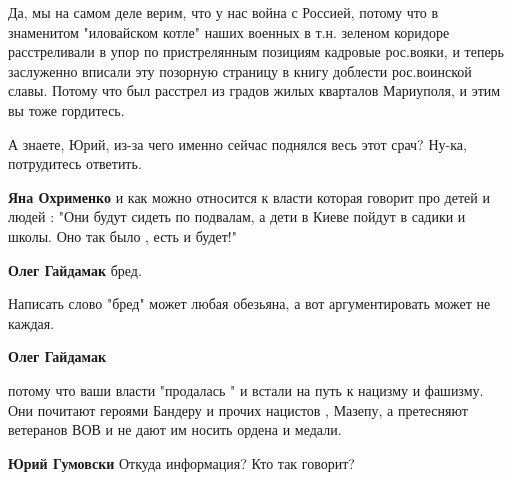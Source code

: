 \begin{itemize}
\begin{itemize}


Да, мы на самом деле верим, что у нас война с Россией, потому что в знаменитом
"иловайском котле" наших военных в т.н. зеленом коридоре расстреливали в упор
по пристрелянным позициям кадровые рос.вояки, и теперь заслуженно вписали эту
позорную страницу в книгу доблести рос.воинской славы. Потому что был расстрел
из градов жилых кварталов Мариуполя, и этим вы тоже гордитесь.


А знаете, Юрий, из-за чего именно сейчас поднялся весь этот срач? Ну-ка, потрудитесь ответить.


\textbf{Яна Охрименко} и как можно относится к власти которая говорит про детей и людей : "Они будут сидеть по подвалам, а дети в Киеве пойдут в садики и школы. Оно так было , есть и будет!"


\textbf{Олег Гайдамак} бред.


Написать слово "бред" может любая обезьяна, а вот аргументировать может не каждая.


\textbf{Олег Гайдамак} 

потому что ваши власти "продалась " и встали на путь к нацизму и фашизму. Они
почитают героями Бандеру и прочих нацистов , Мазепу, а претесняют ветеранов ВОВ
и не дают им носить ордена и медали.


\textbf{Юрий Гумовски} Откуда информация? Кто так говорит?



\end{itemize}
\end{itemize}
